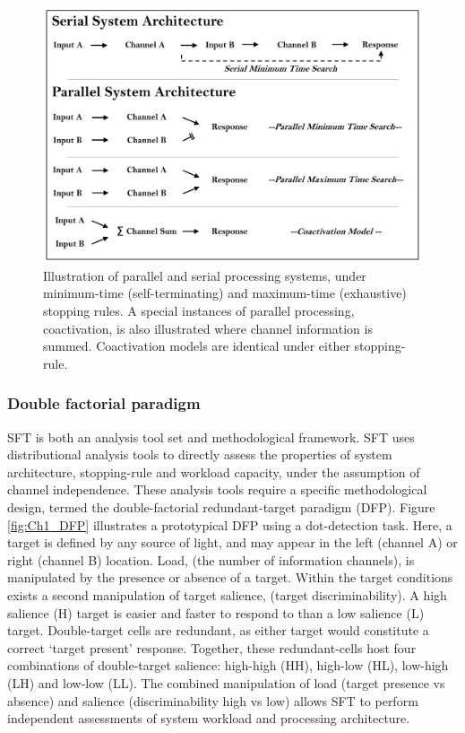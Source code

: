 \begin{figure}[tbh]
\centering \includegraphics[scale=.54]{Figures/Intro/Architecture.pdf}
\caption{Illustration of parallel and serial processing systems, under minimum-time (self-terminating) and maximum-time (exhaustive) stopping rules. A special instances of parallel processing, coactivation, is also illustrated where channel information is summed. Coactivation models are identical under either stopping-rule.}
\label{fig:Ch1_ProcessingChannels}
\end{figure}

\subsubsection{Double factorial paradigm}
SFT is both an analysis tool set and methodological framework. SFT uses distributional analysis tools to directly assess the properties of system architecture, stopping-rule and workload capacity, under the assumption of channel independence. These analysis tools require a specific methodological design, termed the double-factorial redundant-target paradigm (DFP). Figure \ref{fig:Ch1_DFP} illustrates a prototypical DFP using a dot-detection task. Here, a target is defined by any source of light, and may appear in the left (channel A) or right (channel B) location. Load, (\ie the number of information channels), is manipulated by the presence or absence of a target. Within the target conditions exists a second manipulation of target salience, (\ie target discriminability). A high salience (H) target is easier and faster to respond to than a low salience (L) target. Double-target cells are redundant, as either target would constitute a correct `target present' response. Together, these redundant-cells host four combinations of double-target salience: high-high (HH), high-low (HL), low-high (LH) and low-low (LL). The combined manipulation of load (target presence vs absence) and salience (discriminability high vs low) allows SFT to perform independent assessments of system workload and processing architecture. 


